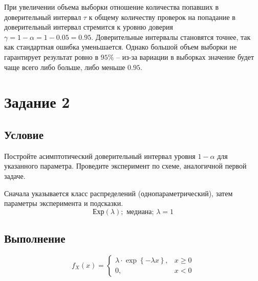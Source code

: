 \documentclass[a4paper, 12pt]{article}
\begin{document}
    При увеличении объема выборки отношение количества попавших в доверительный интервал $\tau$ к общему
    количеству проверок на попадание в доверительный интервал стремится к уровню доверия $\gamma=1-\alpha=1-0.05=0.95$.
    Доверительные интервалы становятся точнее, так как стандартная ошибка уменьшается. Однако большой
    объем выборки не гарантирует результат ровно в $95\%$ -- из-за вариации в выборках значение будет
    чаще всего либо больше, либо меньше $0.95$.


    \section{Задание 2}
    \subsection{Условие}
    Постройте асимптотический доверительный интервал уровня $1-\alpha$ для указанного параметра.
    Проведите эксперимент по схеме, аналогичной первой задаче.
    
    
    Сначала указывается класс распределений (однопараметрический),
    затем параметры эксперимента и подсказки.
    $$\text{Ехр}(\lambda);\text{ медиана};\,\lambda=1$$


    \subsection{Выполнение}
    $$f_X(x)=
    \begin{cases}
        \lambda\cdot\exp{\left\{-\lambda x\right\}},& x\geq0\\
        0,& x < 0
    \end{cases}$$
\end{document}
